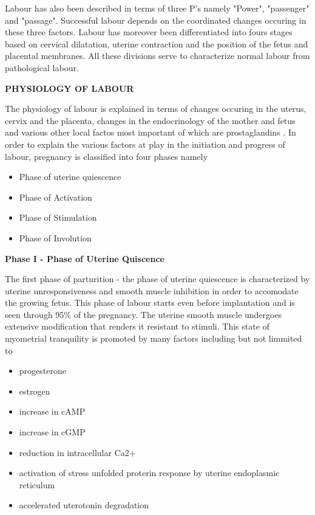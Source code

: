\documentclass[14pt]{extarticle}
\begin{document}
Labour has also been described in terms of three P's namely "Power", "passenger" and "passage". Successful labour depends on the coordinated changes occuring in these three factors. Labour has moreover been differentiated into fours stages based on cervical dilatation, uterine contraction and the position of the fetus and placental membranes. All these divisions serve to characterize normal labour from pathological labour.

\textbf{PHYSIOLOGY OF LABOUR}

The physiology of labour is explained in terms of changes occuring in the uterus, cervix and the placenta, changes in the endocrinology of the mother and fetus and various other local factos most important of which are prostaglandins \cite{myattExpressionLocalizationFunction2004}. In order to explain the various factors at play in the initiation and progress of labour, pregnancy is classified into four phases namely

\begin{itemize}
    \item Phase of uterine quiescence 
    \item Phase of Activation
    \item Phase of Stimulation 
    \item Phase of Involution
\end{itemize}

\textbf{Phase I - Phase of Uterine Quiscence}

The first phase of parturition - the phase of uterine quiescence is characterized by uterine unresponsiveness and smooth muscle inhibition in order to accomodate the growing fetus. This phase of labour starts even before implantation and is seen through 95\% of the pregnancy. The uterine smooth muscle undergoes extensive modification that renders it resistant to stimuli. This state of myometrial tranquility is promoted by many factors including but not limmited to 

\begin{itemize}
    \item progesterone 
    \item estrogen
    \item increase in cAMP
    \item increase in cGMP
    \item reduction in intracellular Ca2+
    \item activation of stress unfolded proterin response by uterine endoplasmic reticulum
    \item accelerated uterotonin degradation
\end{itemize}
\end{document}

